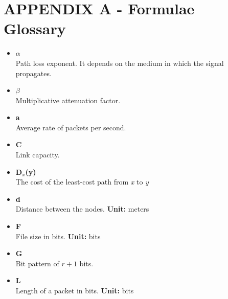 \documentclass{article}
\begin{document}

\newpage

\section{APPENDIX A - Formulae Glossary}

\begin{itemize}
	\item \textbf{$\alpha$}
	\vspace{.2cm} \\
	Path loss exponent. It depends on the medium in which the signal propagates.
	
	\item \textbf{$\beta$}
	\vspace{.2cm} \\
	Multiplicative attenuation factor.	
	
	\item \textbf{a}
	\vspace{.2cm} \\
	Average rate of packets per second.
	
	\item \textbf{C}
	\vspace{.2cm} \\
	Link capacity.
	
	\item \textbf{D$_x$(y)}
	\vspace{.2cm} \\
	The cost of the least-cost path from \textit{x} to \textit{y}
	
	\item \textbf{d}
	\vspace{.2cm} \\
	Distance between the nodes. \textbf{Unit:} meters
	
	\item \textbf{F}
	\vspace{.2cm} \\
	File size in bits. \textbf{Unit:} bits
	
	\item \textbf{G}
	\vspace{.2cm} \\
	Bit pattern of $r+1$ bits.
	
	\item \textbf{L}
	\vspace{.2cm} \\
	Length of a packet in bits. \textbf{Unit:} bits
	

\end{itemize}
\end{document}
